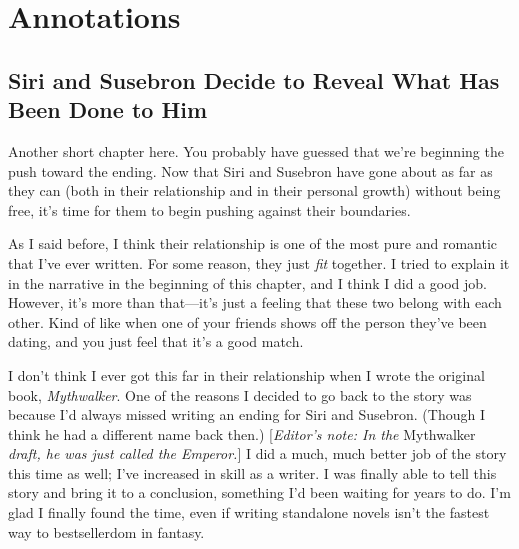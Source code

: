 \section*{Annotations}

\subsection*{Siri and Susebron Decide to Reveal What Has Been Done to Him}

Another short chapter here. You probably have guessed that we’re beginning the push toward the ending. Now that Siri and Susebron have gone about as far as they can (both in their relationship and in their personal growth) without being free, it’s time for them to begin pushing against their boundaries.

As I said before, I think their relationship is one of the most pure and romantic that I’ve ever written. For some reason, they just \textit{fit} together. I tried to explain it in the narrative in the beginning of this chapter, and I think I did a good job. However, it’s more than that—it’s just a feeling that these two belong with each other. Kind of like when one of your friends shows off the person they’ve been dating, and you just feel that it’s a good match.

I don’t think I ever got this far in their relationship when I wrote the original book, \textit{Mythwalker}. One of the reasons I decided to go back to the story was because I’d always missed writing an ending for Siri and Susebron. (Though I think he had a different name back then.) [\textit{Editor’s note: In the }Mythwalker\textit{ draft, he was just called the Emperor.}] I did a much, much better job of the story this time as well; I’ve increased in skill as a writer. I was finally able to tell this story and bring it to a conclusion, something I’d been waiting for years to do. I’m glad I finally found the time, even if writing standalone novels isn’t the fastest way to bestsellerdom in fantasy.



